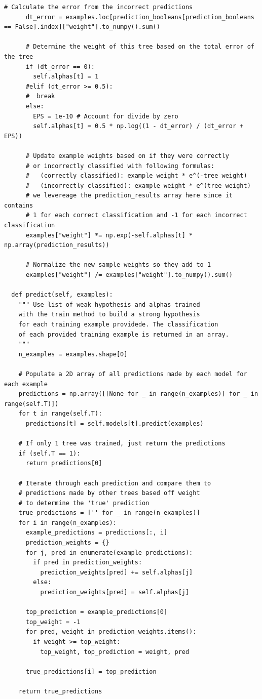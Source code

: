 \documentclass[a4paper]{article}
\begin{document}
\begin{lstlisting}[basicstyle= \scriptsize]
      # Calculate the error from the incorrect predictions
      dt_error = examples.loc[prediction_booleans[prediction_booleans == False].index]["weight"].to_numpy().sum()

      # Determine the weight of this tree based on the total error of the tree    
      if (dt_error == 0):
        self.alphas[t] = 1
      #elif (dt_error >= 0.5):
      #  break
      else:
        EPS = 1e-10 # Account for divide by zero
        self.alphas[t] = 0.5 * np.log((1 - dt_error) / (dt_error + EPS)) 

      # Update example weights based on if they were correctly
      # or incorrectly classified with following formulas:
      #   (correctly classified): example weight * e^(-tree weight) 
      #   (incorrectly classified): example weight * e^(tree weight)
      # we levereage the prediction_results array here since it contains
      # 1 for each correct classification and -1 for each incorrect classification
      examples["weight"] *= np.exp(-self.alphas[t] * np.array(prediction_results))

      # Normalize the new sample weights so they add to 1
      examples["weight"] /= examples["weight"].to_numpy().sum()

  def predict(self, examples):
    """ Use list of weak hypothesis and alphas trained
    with the train method to build a strong hypothesis 
    for each training example providede. The classification
    of each provided training example is returned in an array.
    """
    n_examples = examples.shape[0]

    # Populate a 2D array of all predictions made by each model for each example
    predictions = np.array([[None for _ in range(n_examples)] for _ in range(self.T)])
    for t in range(self.T):
      predictions[t] = self.models[t].predict(examples)

    # If only 1 tree was trained, just return the predictions
    if (self.T == 1):
      return predictions[0]

    # Iterate through each prediction and compare them to
    # predictions made by other trees based off weight
    # to determine the 'true' prediction
    true_predictions = ['' for _ in range(n_examples)]
    for i in range(n_examples):
      example_predictions = predictions[:, i]
      prediction_weights = {} 
      for j, pred in enumerate(example_predictions):
        if pred in prediction_weights:
          prediction_weights[pred] += self.alphas[j]
        else:
          prediction_weights[pred] = self.alphas[j]

      top_prediction = example_predictions[0] 
      top_weight = -1
      for pred, weight in prediction_weights.items():
        if weight >= top_weight:
          top_weight, top_prediction = weight, pred

      true_predictions[i] = top_prediction

    return true_predictions
\end{lstlisting}
\end{document}
